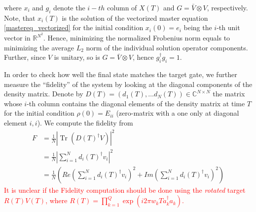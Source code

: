 \documentclass[letterpaper]{article}
\DeclareMathOperator{\Tr}{Tr}
\newcommand{\R}{\mathds{R}}
\newcommand{\C}{\mathds{C}}
\begin{document}
where $x_i$ and $g_i$ denote the $i-th$ column of $X(T)$ and $G=\bar V\otimes V$, respectively. Note, that $x_i(T)$ is the solution of the vectorized master equation \eqref{mastereq_vectorized} for the initial condition $x_i(0) = e_i$ being the $i$-th unit vector in $\R^{N^2}$. Hence, minimizing the normalized Frobenius norm equals to minimizing the average $L_2$ norm of the individual solution operator components. Further, since $V$ is unitary, so is $G=\bar V\otimes V$, hence $g_i^{\dagger}g_i = 1$.

In order to check how well the final state matches the target gate, we further measure the ``fidelity'' of the system by looking at the diagonal components of the density matrix. Denote by $D(T) = (d_1(T), \dots d_N(T)) \in \C^{N\times N}$ the matrix whose $i$-th column contains the diagonal elements of the density matrix at time $T$ for the initial condition $\rho(0) = E_{ii}$ (zero-matrix with a one only at diagonal element $i,i$). We compute the fidelity from 
\begin{align}
  F &= \frac{1}{N} \left|\Tr(D(T)^{\dagger}V) \right|^2 \\
    &= \frac{1}{N} \left| \sum_{i=1}^N d_i(T)^{\dagger}v_i \right|^2 \\
    &= \frac{1}{N} \left( Re\left(\sum_{i=1}^N d_i(T)^{\dagger}v_i\right)^2 + Im\left( \sum_{i=1}^N d_i(T)^{\dagger}v_i \right)^2 \right)
\end{align}
\textcolor{red}{It is unclear if the Fidelity computation should be done using the \textit{rotated} target $R(T)V(T)$, where $R(T) = \prod_{k=1}^Q \exp( i2\pi w_kTa_k^{\dagger}a_k)$.}
\end{document}
